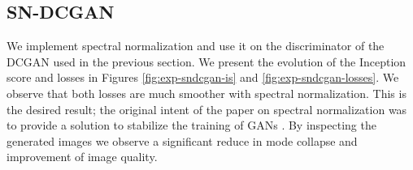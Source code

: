 \subsection{SN-DCGAN}
\label{sec:exp-sndcgan}
We implement spectral normalization and use it on the discriminator of the DCGAN used in the previous section. We present the evolution of the Inception score and losses in Figures \ref{fig:exp-sndcgan-is} and \ref{fig:exp-sndcgan-losses}. We observe that both losses are much smoother with spectral normalization. This is the desired result; the original intent of the paper on spectral normalization was to provide a solution to stabilize the training of GANs \cite{miyato2018spectral}. By inspecting the generated images we observe a significant reduce in mode collapse and improvement of image quality. %
